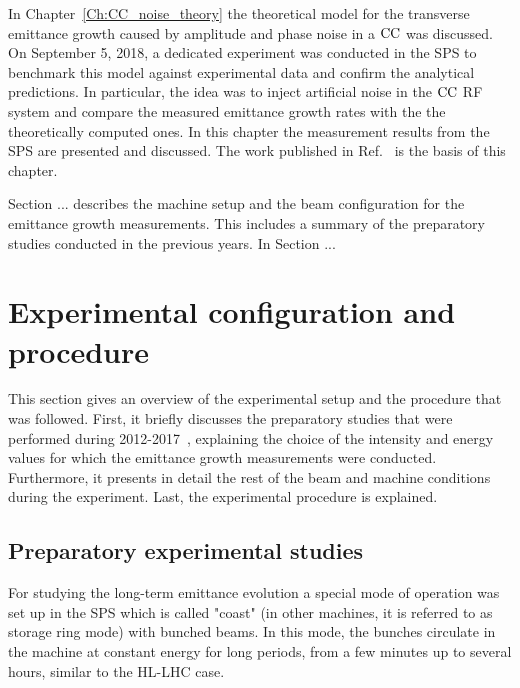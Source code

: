 \vspace*{-1mm}
In Chapter~\ref{Ch:CC_noise_theory} the theoretical model for the transverse emittance growth caused by amplitude and phase noise in a ${\mathrm{CC}}$ was discussed. On September 5, 2018, a dedicated experiment was conducted in the SPS to benchmark this model against experimental data and confirm the analytical predictions. In particular, the idea was to inject artificial noise in the ${\mathrm{CC}}$ RF system and compare the measured emittance growth rates with the the theoretically computed ones. In this chapter the measurement results from the SPS are presented and discussed. The work published in Ref.~\cite{Triantafyllou:2021khx} is the basis of this chapter.


Section ... describes the machine setup and the beam configuration for the emittance growth measurements. This includes a summary of the preparatory studies conducted in the previous years. In Section ...


\section{Experimental configuration and procedure}\label{sec:exp_setup_2018}
This section gives an overview of the experimental setup and the procedure that was followed. First, it briefly discusses the preparatory studies that were performed during 2012-2017~\cite{Calaga:1451286, Alekou_CC_coast_prep_2016, Antoniou:2649815}, explaining the choice of the intensity and energy values for which the emittance growth measurements were conducted. Furthermore, it presents in detail the rest of the beam and machine conditions during the experiment. Last, the experimental procedure is explained.

\subsection{Preparatory experimental studies}
For studying the long-term emittance evolution a special mode of operation was set up in the SPS which is called "coast" (in other machines, it is referred to as storage ring mode) with bunched beams. In this mode, the bunches circulate in the machine at constant energy for long periods, from a few minutes up to several hours, similar to the HL-LHC case.\setlength{\parskip}{2ex} %


